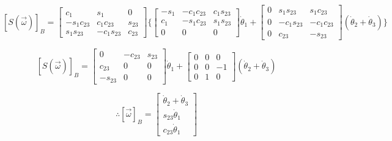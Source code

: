 \documentclass[12pt,a4paper]{article}
\begin{document}
$$ [S(\vec{\omega})]_B = 
\begin{bmatrix}
c_1 & s_1 & 0  \\
-s_1 c_{23} & c_1 c_{23} &  s_{23}  \\
s_1 s_{23} & -c_1 s_{23} & c_{23} 
\end{bmatrix} \Big\{
\begin{bmatrix}
-s_1 & -c_1 c_{23} & c_1 s_{23}  \\
c_1 & -s_1 c_{23} & s_1 s_{23}  \\
0 & 0 & 0 
\end{bmatrix}
\dot{\theta}_1 +
\begin{bmatrix}
0 & s_1 s_{23} & s_1 c_{23}  \\
0 & -c_1 s_{23} & -c_1 c_{23}  \\
0 & c_{23} & -s_{23} 
\end{bmatrix}
(\dot{\theta}_2 + \dot{\theta}_3)
\Big\}
 $$
 
 $$ [S(\vec{\omega})]_B = 
\begin{bmatrix}
0 & - c_{23} &  s_{23}  \\
c_{23} & 0 & 0 \\
-s_{23} & 0 & 0 
\end{bmatrix}
\dot{\theta}_1 +
\begin{bmatrix}
0 & 0 & 0  \\
0 & 0 & -1  \\
0 & 1 & 0 
\end{bmatrix}
(\dot{\theta}_2 + \dot{\theta}_3)
$$

$$ \therefore [\vec{\omega}]_B =
\begin{bmatrix}
\dot{\theta}_2 + \dot{\theta}_3 \\
s_{23} \dot{\theta}_1 \\
c_{23} \dot{\theta}_1
\end{bmatrix} $$
\end{document}

